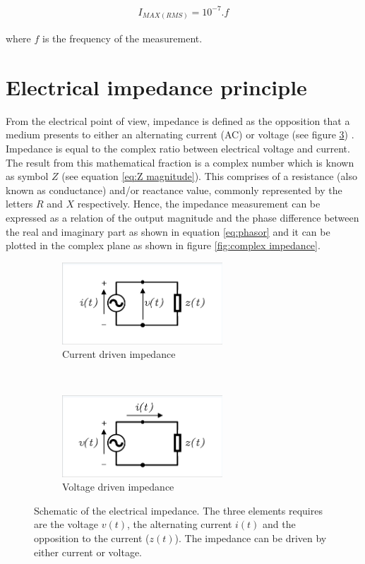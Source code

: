 \begin{align}
	\label{eq:current body}
	I_{MAX(RMS)} = 10^{-7}.f
\end{align}

where $f$ is the frequency of the measurement.

\section{Electrical impedance principle}
\label{section impedance principle}
From the electrical point of view, impedance is defined as the opposition that a medium presents to either an alternating current (AC) or voltage (see figure \ref{fig:impedance}) \cite{callegaro2012electrical}. Impedance is equal to the complex ratio between electrical voltage and current. The result from this mathematical fraction is a complex number which is known as symbol $Z$ (see equation \ref{eq:Z magnitude}). This comprises of a resistance (also known as conductance) and/or reactance value, commonly represented by the letters $R$ and $X$ respectively. Hence, the impedance measurement can be expressed as a relation of the output magnitude and the phase difference between the real and imaginary part as shown in equation \ref{eq:phasor} and it can be plotted in the complex plane as shown in figure \ref{fig:complex impedance}.

\begin{figure}[!htpb]
	\centering
	\begin{subfigure}[t]{0.4\textwidth}
		\centering
		\includegraphics[width=6cm,trim={0.05cm 0.05cm 0.05cm 0.15cm},clip,keepaspectratio]{figure0a}    
		\caption{Current driven impedance}
		\label{fig:impedance a}
	\end{subfigure}
	~
	\begin{subfigure}[t]{0.4\textwidth}
		\centering
		\includegraphics[width=6cm,trim={0.05cm 0.05cm 0.05cm 0.15cm},clip,keepaspectratio]{figure0b}    
		\caption{Voltage driven impedance}
		\label{fig:impedance b}
	\end{subfigure}
	\caption[Impedance representation from two-terminal element]{Schematic of the electrical impedance. The three elements requires are the voltage $v(t)$, the alternating current $i(t)$ and the opposition to the current ($z(t)$). The impedance can be driven by either current or voltage.}
	\label{fig:impedance}
\end{figure}

